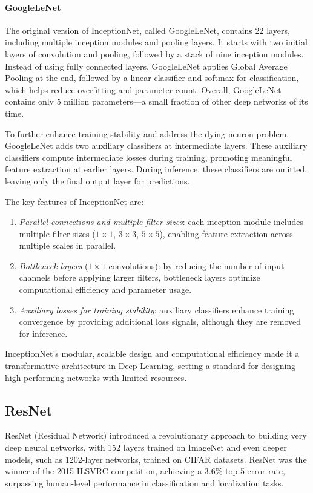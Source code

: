 \paragraph*{GoogleLeNet} 
The original version of InceptionNet, called GoogleLeNet, contains 22 layers, including multiple inception modules and pooling layers. 
It starts with two initial layers of convolution and pooling, followed by a stack of nine inception modules.
Instead of using fully connected layers, GoogleLeNet applies Global Average Pooling at the end, followed by a linear classifier and softmax for classification, which helps reduce overfitting and parameter count. 
Overall, GoogleLeNet contains only 5 million parameters—a small fraction of other deep networks of its time.

To further enhance training stability and address the dying neuron problem, GoogleLeNet adds two auxiliary classifiers at intermediate layers. 
These auxiliary classifiers compute intermediate losses during training, promoting meaningful feature extraction at earlier layers.
During inference, these classifiers are omitted, leaving only the final output layer for predictions.

The key features of InceptionNet are:
\begin{enumerate}
    \item \textit{Parallel connections and multiple filter sizes}: each inception module includes multiple filter sizes ($1\times 1$, $3\times 3$, $5\times 5$), enabling feature extraction across multiple scales in parallel.
    \item \textit{Bottleneck layers} ($1\times 1$ convolutions): by reducing the number of input channels before applying larger filters, bottleneck layers optimize computational efficiency and parameter usage.
    \item \textit{Auxiliary losses for training stability}: auxiliary classifiers enhance training convergence by providing additional loss signals, although they are removed for inference.
\end{enumerate}
InceptionNet's modular, scalable design and computational efficiency made it a transformative architecture in Deep Learning, setting a standard for designing high-performing networks with limited resources.

\subsection{ResNet}
ResNet (Residual Network) introduced a revolutionary approach to building very deep neural networks, with 152 layers trained on ImageNet and even deeper models, such as 1202-layer networks, trained on CIFAR datasets. 
ResNet was the winner of the 2015 ILSVRC competition, achieving a 3.6\% top-5 error rate, surpassing human-level performance in classification and localization tasks.

